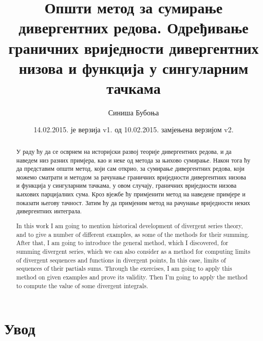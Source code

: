 \documentclass[12pt]{article}
\title{Општи метод за сумирање дивергентних редова. Одређивање граничних вриједности дивергентних низова и функција у сингуларним тачкама}
\author{Синиша Бубоња}
\date{14.02.2015. је верзија v1. од 10.02.2015. замјењена верзијом v2.}
\renewcommand{\abstractname}{Резиме}
\begin{document}
\maketitle
\begin{abstract}
У раду ћу да се осврнем на историјски развој теорије дивергентних редова, и да наведем низ разних примјера, као и неке од метода за њихово сумирање. Након тога ћу да представим општи метод, који сам открио, за сумирање дивергентних редова, који можемо сматрати и методом за рачунање граничних вриједности дивергентних низова и функција у сингуларним тачкама, у овом случају, граничних вриједности низова њихових парцијалних сума. Кроз вјежбе ћу примјенити метод на наведене примјере и показати његову тачност. Затим ћу да примјеним метод на рачунање вриједности неких дивергентних интеграла.
\end{abstract}

\renewcommand{\abstractname}{Abstract}

\begin{abstract}
In this work I am going to mention historical development of divergent series theory, and to give a number of different examples, as some of the methods for their summing. After that, I am going to introduce the general method, which I discovered, for summing divergent series, which  we can also consider as a method for computing limits of divergent sequences and functions in divergent points, In this case, limits of sequences of their partials sums. Through the exercises, I am going to apply this method on given examples and prove its validity. Then I'm going to apply the method to compute the value of some divergent integrals.
\end{abstract}
  
\tableofcontents  
  
\section{Увод}
\end{document}
